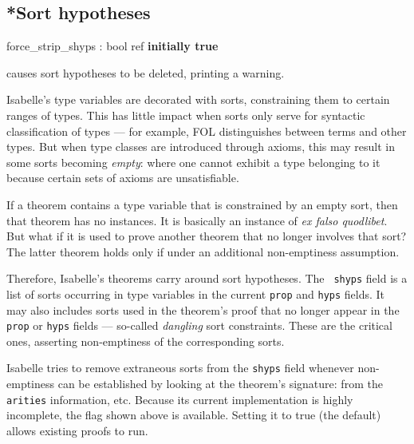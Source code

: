 \subsection{*Sort hypotheses} \label{sec:sort-hyps}
\begin{ttbox} 
force_strip_shyps : bool ref \hfill{\bf initially true}
\end{ttbox}

\begin{ttdescription}
\item[\ttindexbold{force_strip_shyps}]
causes sort hypotheses to be deleted, printing a warning.
\end{ttdescription}

Isabelle's type variables are decorated with sorts, constraining them to
certain ranges of types.  This has little impact when sorts only serve for
syntactic classification of types --- for example, FOL distinguishes between
terms and other types.  But when type classes are introduced through axioms,
this may result in some sorts becoming {\em empty\/}: where one cannot exhibit
a type belonging to it because certain sets of axioms are unsatisfiable.

If a theorem contains a type variable that is constrained by an empty
sort, then that theorem has no instances.  It is basically an instance
of {\em ex falso quodlibet}.  But what if it is used to prove another
theorem that no longer involves that sort?  The latter theorem holds
only if under an additional non-emptiness assumption.

Therefore, Isabelle's theorems carry around sort hypotheses.  The {\tt
shyps} field is a list of sorts occurring in type variables in the current
{\tt prop} and {\tt hyps} fields.  It may also includes sorts used in the
theorem's proof that no longer appear in the {\tt prop} or {\tt hyps}
fields --- so-called {\em dangling\/} sort constraints.  These are the
critical ones, asserting non-emptiness of the corresponding sorts.
 
Isabelle tries to remove extraneous sorts from the {\tt shyps} field whenever
non-emptiness can be established by looking at the theorem's signature: from
the {\tt arities} information, etc.  Because its current implementation is
highly incomplete, the flag shown above is available.  Setting it to true (the
default) allows existing proofs to run.


